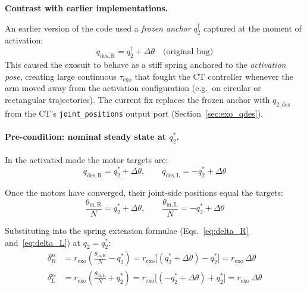 \documentclass[11pt,a4paper]{article}
\begin{document}
\begin{warnbox}
\textbf{Contrast with earlier implementations.}

An earlier version of the code used a \emph{frozen anchor}
$q_2^{\dagger}$ captured at the moment of activation:
\[
    q_{\mathrm{des,R}} = q_2^{\dagger} + \Delta\theta \quad\text{(original bug)}
\]
This caused the exosuit to behave as a stiff spring anchored to the
\emph{activation pose}, creating large continuous $\tau_{\mathrm{exo}}$
that fought the CT controller whenever the arm moved away from the activation
configuration (e.g.\ on circular or rectangular trajectories).
The current fix replaces the frozen anchor with $q_{2,\mathrm{des}}$ from
the CT's \texttt{joint\_positions} output port
(Section~\ref{sec:exo_qdes}).
\end{warnbox}

\bigskip
\paragraph{Pre-condition: nominal steady state at $q_2^{*}$.}

In the activated mode the motor targets are:
\begin{equation}
    q_{\mathrm{des,R}} = q_2^{*} + \Delta\theta, \qquad
    q_{\mathrm{des,L}} = -q_2^{*} + \Delta\theta
\label{eq:nom_targets}
\end{equation}

Once the motors have converged, their joint-side positions equal the targets:
\begin{equation}
    \frac{\theta_{\mathrm{m,R}}}{N} = q_2^{*} + \Delta\theta, \qquad
    \frac{\theta_{\mathrm{m,L}}}{N} = -q_2^{*} + \Delta\theta
\label{eq:nom_motors}
\end{equation}

Substituting into the spring extension formulae (Eqs.~\ref{eq:delta_R}
and~\ref{eq:delta_L}) at $q_2 = q_2^{*}$:
\begin{align}
    \delta_R^{\mathrm{ss}}
      &= r_{\mathrm{exo}}\!\left(\frac{\theta_{\mathrm{m,R}}}{N} - q_2^{*}\right)
       = r_{\mathrm{exo}}\bigl[(q_2^{*}+\Delta\theta)-q_2^{*}\bigr]
       = r_{\mathrm{exo}}\,\Delta\theta
    \label{eq:nom_deltaR}\\[4pt]
    \delta_L^{\mathrm{ss}}
      &= r_{\mathrm{exo}}\!\left(\frac{\theta_{\mathrm{m,L}}}{N} + q_2^{*}\right)
       = r_{\mathrm{exo}}\bigl[(-q_2^{*}+\Delta\theta)+q_2^{*}\bigr]
       = r_{\mathrm{exo}}\,\Delta\theta
    \label{eq:nom_deltaL}
\end{align}
\end{document}
